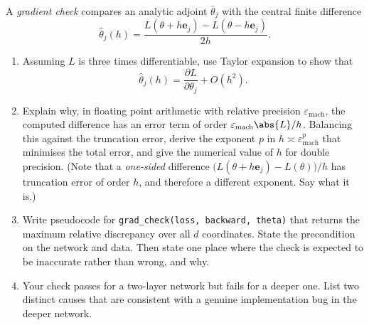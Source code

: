 \begin{exercise}\label{ex:ml-7}
A \emph{gradient check} compares an analytic adjoint $\bar\theta_j$ with the
central finite difference
\[
  \hat\theta_j(h)=\frac{L(\theta+h\mathbf{e}_j)-L(\theta-h\mathbf{e}_j)}{2h}.
\]
\begin{enumerate}[label=(\alph*)]
  \item Assuming $L$ is three times differentiable, use Taylor expansion to show
    that
    \[
      \hat\theta_j(h)=\frac{\partial L}{\partial\theta_j}+O(h^2).
    \]
  \item Explain why, in floating point arithmetic with relative precision
    $\varepsilon_{\mathrm{mach}}$, the computed difference has an error term of
    order $\varepsilon_{\mathrm{mach}}\abs{L}/h$. Balancing this against the
    truncation error, derive the exponent $p$ in $h\asymp\varepsilon_{\mathrm{mach}}^{p}$
    that minimises the total error, and give the numerical value of $h$ for
    double precision. (Note that a \emph{one-sided} difference
    $\bigl(L(\theta+h\mathbf{e}_j)-L(\theta)\bigr)/h$ has truncation error of
    order $h$, and therefore a different exponent. Say what it is.)
  \item Write pseudocode for \texttt{grad\_check(loss, backward, theta)}
    that returns the maximum relative discrepancy over all $d$ coordinates.
    State the precondition on the network and data. Then state one place where
    the check is expected to be inaccurate rather than wrong, and why.
  \item Your check passes for a two-layer network but fails for a deeper one.
    List two distinct causes that are consistent with a genuine implementation
    bug in the deeper network.
\end{enumerate}
\end{exercise}

